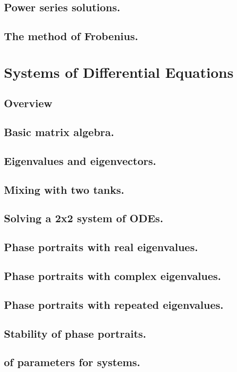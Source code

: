 \documentclass{article}
\begin{document}
\subsection{Power series solutions.}
\subsection{The method of Frobenius.}

\pagebreak
\section{Systems of Differential Equations}
\subsection*{Overview}

\subsection{Basic matrix algebra.}
\subsection{Eigenvalues and eigenvectors.}
\subsection{Mixing with two tanks.}
\subsection{Solving a 2x2 system of ODEs.}
\subsection{Phase portraits with real eigenvalues.}
\subsection{Phase portraits with complex eigenvalues.}
\subsection{Phase portraits with repeated eigenvalues.}
\subsection{Stability of phase portraits.}
\subsection{of parameters for systems.}
\end{document}
